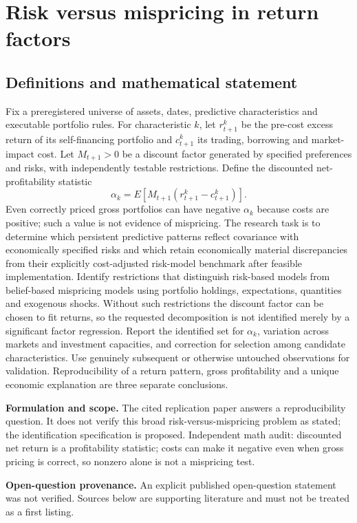 \documentclass[11pt]{article}
\begin{document}
\section*{Risk versus mispricing in return factors}\label{30007596}
\subsection{Definitions and mathematical statement}
Fix a preregistered universe of assets, dates, predictive characteristics and executable portfolio rules. For characteristic \(k\), let \(r^k_{t+1}\) be the pre-cost excess return of its self-financing portfolio and \(c^k_{t+1}\) its trading, borrowing and market-impact cost. Let \(M_{t+1}>0\) be a discount factor generated by specified preferences and risks, with independently testable restrictions. Define the discounted net-profitability statistic
\[\alpha_k=E[M_{t+1}(r^k_{t+1}-c^k_{t+1})].\]
Even correctly priced gross portfolios can have negative \(\alpha_k\) because costs are positive; such a value is not evidence of mispricing. The research task is to determine which persistent predictive patterns reflect covariance with economically specified risks and which retain economically material discrepancies from their explicitly cost-adjusted risk-model benchmark after feasible implementation. Identify restrictions that distinguish risk-based models from belief-based mispricing models using portfolio holdings, expectations, quantities and exogenous shocks. Without such restrictions the discount factor can be chosen to fit returns, so the requested decomposition is not identified merely by a significant factor regression. Report the identified set for \(\alpha_k\), variation across markets and investment capacities, and correction for selection among candidate characteristics. Use genuinely subsequent or otherwise untouched observations for validation. Reproducibility of a return pattern, gross profitability and a unique economic explanation are three separate conclusions.

\par\textbf{Formulation and scope.} The cited replication paper answers a reproducibility question. It does not verify this broad risk-versus-mispricing problem as stated; the identification specification is proposed. Independent math audit: discounted net return is a profitability statistic; costs can make it negative even when gross pricing is correct, so nonzero alone is not a mispricing test.

\par\textbf{Open-question provenance.} An explicit published open-question statement was not verified. Sources below are supporting literature and must not be treated as a first listing.
\end{document}
